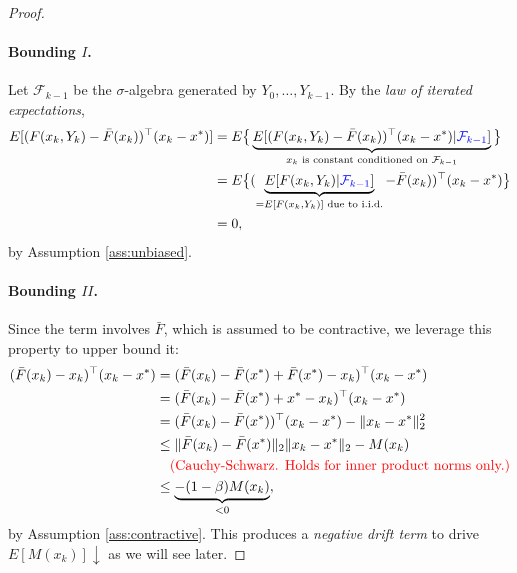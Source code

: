 \documentclass[11pt,twoside]{article}
\begin{document}
\begin{proof}
    \paragraph{Bounding $I$.}  Let $\mathcal{F}_{k-1}$ be the $\sigma$-algebra generated by $Y_0, \dots, Y_{k-1}$. By the \emph{law of iterated expectations},
    \begin{align*}
        E[(F(x_k,Y_k) - \bar F(x_k))^\top(x_k - x^*)] &= E\big\{\underbrace{E[(F(x_k,Y_k) - \bar F(x_k))^\top(x_k - x^*)|\textcolor{blue}{\mathcal{F}_{k-1}}]}_{\text{$x_k$ is constant conditioned on $\mathcal{F}_{k-1}$}}\big\} \\
        &=  E\big\{{(\underbrace{E[F(x_k,Y_k)|\textcolor{blue}{\mathcal{F}_{k-1}}]}_{=E[F(x_k,Y_k)] \text{ due to i.i.d.}} - \bar F(x_k))^\top(x_k - x^*)}\big\} \\
        &= 0,
    \end{align*}
    by Assumption \ref{ass:unbiased}.

    \paragraph{Bounding $II$.} Since the term involves $\bar{F}$, which is assumed to be contractive, we leverage this property to upper bound it:
    \begin{align*}
        (\bar F(x_k)- x_k)^\top(x_k - x^*) &= (\bar F(x_k)- \bar F(x^*) + \bar F(x^*) - x_k)^\top(x_k - x^*) \\
        &= (\bar F(x_k)- \bar F(x^*) + x^* - x_k)^\top(x_k - x^*) \\
        &= (\bar F(x_k)- \bar F(x^*))^\top(x_k - x^*) - \|x_k - x^*\|_2^2 \\
        &\leq \|\bar F(x_k)- \bar F(x^*)\|_2 \|x_k - x^*\|_2 - M(x_k) \\
        & \quad{\textcolor{red}{(\text{Cauchy-Schwarz. Holds for inner product norms only.})}} \\
        &\leq \underbrace{-(1-\beta) M(x_k)}_{< 0},
    \end{align*}
    by Assumption \ref{ass:contractive}. This produces a \emph{negative drift term} to drive $E[M(x_k)] \downarrow$ as we will see later. 


\end{proof}
\end{document}
